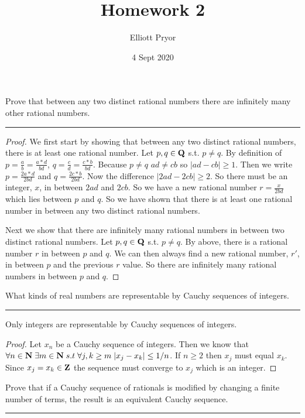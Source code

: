 \documentclass[11pt]{article}
\title{Homework 2}
\author{Elliott Pryor}
\date{4 Sept 2020}
\begin{document}
\maketitle

Prove that between any two distinct rational numbers there are infinitely many other rational numbers.
\hrule

\begin{proof}
We first start by showing that between any two distinct rational numbers, there is at least one rational number. Let $p, q \in \mathbf{Q}$ s.t. $p \neq q$. By definition of $p = \frac{a}{b} = \frac{a * d}{bd}$, $q = \frac{c}{d} = \frac{ c * b}{bd}$. Because $p \neq q$ $ad \neq cb$ so $|ad - cb| \geq 1$. Then we write $p = \frac{2a * d}{2bd}$ and $q = \frac{2 c * b}{2bd}$. Now the difference $|2ad - 2 cb| \geq 2$. So there must be an integer, $x$, in between $2ad$ and $2cb$.  So we have a new rational number $r = \frac{x}{2bd}$ which lies between $p$ and $q$. So we have shown that there is at least one rational number in between any two distinct rational numbers.

Next we show that there are infinitely many rational numbers in between two distinct rational numbers. Let $p, q \in \mathbf{Q}$ s.t. $p \neq q$. By above, there is a rational number $r$ in between $p$ and $q$. We can then always find a new rational number, $r'$, in between $p$ and the previous $r$ value. So there are infinitely many rational numbers in between $p$ and $q$.

\end{proof}




\newpage
{}
What kinds of real numbers are representable by Cauchy sequences of integers.
\hrule

Only integers are representable by Cauchy sequences of integers. 

\begin{proof} 

Let $x_n$ be a Cauchy sequence of integers. Then we know that $\forall n \in \mathbf{N} \; \exists m \in \mathbf{N} \; s.t \; \forall j,k \geq m \; |x_j - x_k| \leq 1/n$. If $n \geq 2$ then $x_j$ must equal $x_k$. Since $x_j = x_k \in \mathbf{Z}$ the sequence must converge to $x_j$ which is an integer.
\end{proof}




\newpage
{}
Prove that if a Cauchy sequence of rationals is modified by changing a finite number of terms, the result is an equivalent Cauchy sequence.
\hrule
\end{document}
